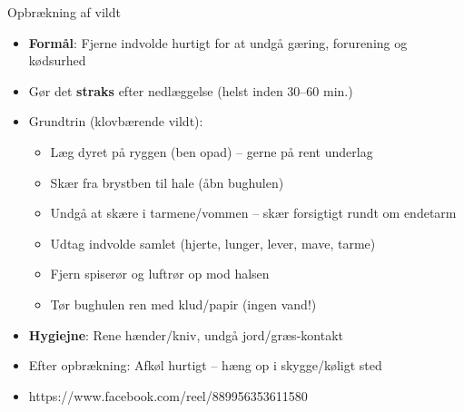 \begin{frame}{Opbrækning af vildt}
    \begin{itemize}
        \item \textbf{Formål}: Fjerne indvolde hurtigt for at undgå gæring, forurening og kødsurhed
        \item Gør det \textbf{straks} efter nedlæggelse (helst inden 30–60 min.)
        \item Grundtrin (klovbærende vildt):
          \begin{itemize}
            \item Læg dyret på ryggen (ben opad) – gerne på rent underlag
            \item Skær fra brystben til hale (åbn bughulen)
            \item Undgå at skære i tarmene/vommen – skær forsigtigt rundt om endetarm
            \item Udtag indvolde samlet (hjerte, lunger, lever, mave, tarme)
            \item Fjern spiserør og luftrør op mod halsen
            \item Tør bughulen ren med klud/papir (ingen vand!)
          \end{itemize}
        \item \textbf{Hygiejne}: Rene hænder/kniv, undgå jord/græs-kontakt
        \item Efter opbrækning: Afkøl hurtigt – hæng op i skygge/køligt sted
        \item https://www.facebook.com/reel/889956353611580
    \end{itemize}
\end{frame}




